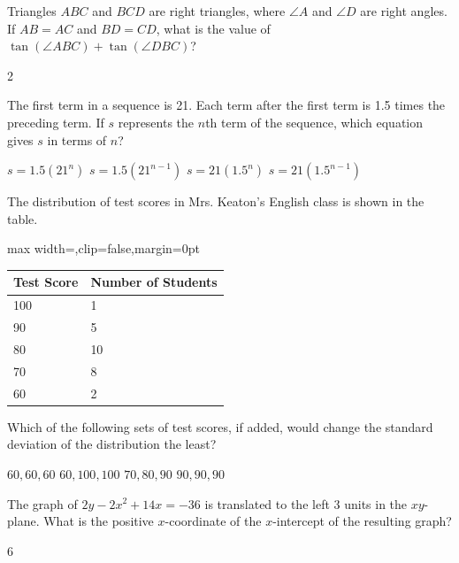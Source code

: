 \question[1]
Triangles $ABC$ and $BCD$ are right triangles, where $\angle A$ and $\angle D$ are right angles. If $AB=AC$ and $BD=CD$, what is the value of $\tan(\angle ABC)+\tan(\angle DBC)$?
\begin{solution}
2
\end{solution}





\newpage



\question[1]
The first term in a sequence is 21. Each term after the first term is 1.5 times the preceding term. If $s$ represents the $n$th term of the sequence, which equation gives $s$ in terms of $n$?
\begin{choices}
  \choice $s=1.5\left(21^n\right)$
  \choice $s=1.5\left(21^{n-1}\right)$
  \choice $s=21\left(1.5^n\right)$
  \CorrectChoice $s=21\left(1.5^{n-1}\right)$
\end{choices}

\question[1]
The distribution of test scores in Mrs. Keaton's English class is shown in the table.
\begin{center}
  \renewcommand{\arraystretch}{1.3}
  \setlength{\tabcolsep}{0.5em}
  \label{tab:sat-drill-10-vocab}%
  \vspace{0.35em}
  \begin{adjustbox}{max width=\linewidth,clip=false,margin=0pt}
  \begin{tabular}{|l|l|}
    \hline
    \cellcolor[HTML]{E0E0E0}\textbf{Test Score} & \cellcolor[HTML]{E0E0E0}\textbf{Number of Students} \\
    \hline
    100 & 1 \\
    \hline
    90 & 5 \\
    \hline
    80 & 10 \\
    \hline
    70 & 8 \\
    \hline
    60 & 2 \\
    \hline
  \end{tabular}
  \end{adjustbox}
\end{center}
Which of the following sets of test scores, if added, would change the standard deviation of the distribution the least?
\begin{choices}
  \choice $60,60,60$
  \choice $60,100,100$
  \CorrectChoice $70,80,90$
  \choice $90,90,90$
\end{choices}

\question[1]
The graph of $2y-2x^2+14x=-36$ is translated to the left 3 units in the $xy$-plane. What is the positive $x$-coordinate of the $x$-intercept of the resulting graph?
\begin{solution}
6
\end{solution}

